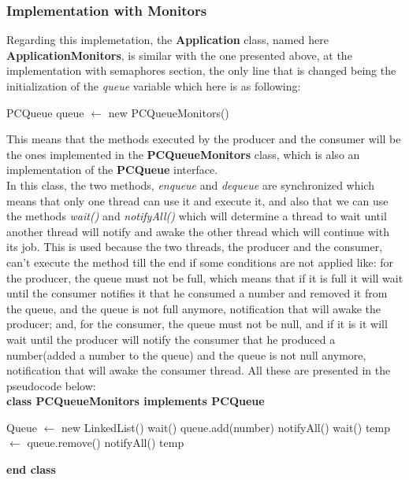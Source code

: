 \documentclass[14pt]{article}
\begin{document}
\subsubsection{Implementation with Monitors}
Regarding this implemetation, the \textbf{Application} class, named here \textbf{ApplicationMonitors}, is similar with the one presented above, at the implementation with semaphores section, the only line that is changed being the initialization of the \textit{queue} variable which here is as following:
\begin{algorithmic}
\State PCQueue queue $\gets$ new PCQueueMonitors()
\end{algorithmic}
This means that the methods executed by the producer and the consumer will be the ones implemented in the \textbf{PCQueueMonitors} class, which is also an implementation of the \textbf{PCQueue} interface.
\vspace{2.5 mm}
\\In this class, the two methods, \textit{enqueue} and \textit{dequeue} are synchronized which means that only one thread can use it and execute it, and also that we can use the methods \textit{wait()} and \textit{notifyAll()} which will determine a thread to wait until another thread will notify and awake the other thread which will continue with its job. This is used because the two threads, the producer and the consumer, can't execute the method till the end if some conditions are not applied like: for the producer, the queue must not be full, which means that if it is full it will wait until the consumer notifies it that he consumed a number and removed it from the queue, and the queue is not full anymore, notification that will awake the producer; and, for the consumer, the queue must not be null, and if it is it will wait until the producer will notify the consumer that he produced a number(added a number to the queue) and the queue is not null anymore, notification that will awake the consumer thread. All these are presented in the pseudocode below:
\vspace{2.5 mm}
\\\textbf{class PCQueueMonitors implements PCQueue}
\begin{algorithmic}
\State Queue $\gets$ new LinkedList()
        \State wait()
    \EndWhile
    \State queue.add(number)
    \State notifyAll()
\EndFunction
\vspace{1 mm}
        \State wait()
    \EndWhile
    \State temp $\gets$ queue.remove()
    \State notifyAll()
    \State \Return temp
\EndFunction
\end{algorithmic}
\textbf{end class}
\end{document}
